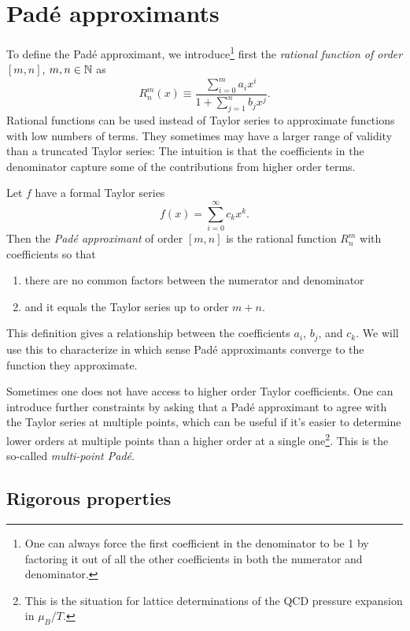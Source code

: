 \section{Pad\'e approximants}

To define the Pad\'e approximant, we introduce\footnote{One can always force
the first coefficient in the denominator to be 1 by factoring it out of all
the other coefficients in both the numerator and denominator.} first the {\it rational
function of order} $[m,n]$, $m,n\in\mathbb{N}$ as 
\begin{equation}
  R_n^m(x)\equiv\frac{\sum_{i=0}^m a_ix^i}{1+\sum_{j=1}^nb_jx^j}.
\end{equation}
Rational functions can be used instead of Taylor series to approximate
functions with low numbers of terms. They sometimes may have a larger range of
validity than a truncated Taylor series: The intuition is that the coefficients
in the denominator capture some of the contributions from higher order terms.

Let $f$ have a formal Taylor series
\begin{equation}
  f(x)=\sum_{i=0}^\infty c_kx^k.
\end{equation}
Then the {\it Pad\'e approximant} of order $[m,n]$ is the rational function
$R_n^m$ with coefficients so that
\begin{enumerate}
  \item there are no common factors between the numerator and denominator
  \item and it equals the Taylor series up to order $m+n$.
\end{enumerate}
This definition gives a relationship between the coefficients $a_i$, $b_j$, and
$c_k$. We will use this to characterize in which sense Pad\'e approximants
converge to the function they approximate.

Sometimes one does not have access to higher order Taylor coefficients.
One can introduce further constraints by asking that a Pad\'e approximant to agree
with the Taylor series at multiple points, which can be useful if it's easier to
determine lower orders at multiple points than a higher order at a single
one\footnote{This is the situation for lattice determinations of the QCD
pressure expansion in $\mu_B/T$.}. This is the so-called
{\it multi-point Pad\'e}.

\subsection{Rigorous properties}

